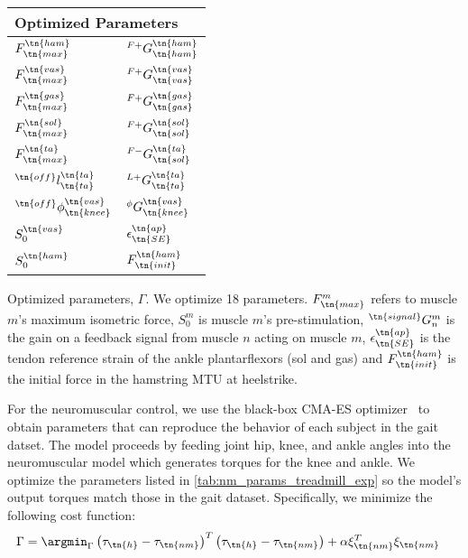 \begin{margintable}    
    \centering
    \normalsize
    \begin{tabular}{ll}
        \multicolumn{2}{l}{Optimized Parameters} \\
        \midrule
        $F_\tn{max}^\tn{ham}$              & $^{F+}G_\tn{ham}^\tn{ham}$   \\
        $F_\tn{max}^\tn{vas}$              & $^{F+}G_\tn{vas}^\tn{vas}$   \\
        $F_\tn{max}^\tn{gas}$              & $^{F+}G_\tn{gas}^\tn{gas}$   \\
        $F_\tn{max}^\tn{sol}$              & $^{F+}G_\tn{sol}^\tn{sol}$   \\
        $F_\tn{max}^\tn{ta}$               & $^{F-}G_\tn{sol}^\tn{ta}$    \\
        $^\tn{off}l_\tn{ta}^\tn{ta}$       & $^{L+}G_\tn{ta}^\tn{ta}$     \\
        $^\tn{off}\phi_\tn{knee}^\tn{vas}$ & ${^\phi}G_\tn{knee}^\tn{vas}$ \\
        $S_0^\tn{vas}$                     & $\epsilon_\tn{SE}^\tn{ap}$   \\
        $S_0^\tn{ham}$                     & $F_\tn{init}^\tn{ham}$       \\
    \end{tabular}
    \caption[Parameters optimized for parameter set generation for experiment
    comparing neuromuscular and impedance control]{Optimized parameters,
    $\Gamma$. We optimize 18 parameters. $F_\tn{max}^m$ refers to muscle $m$'s
    maximum isometric force, $S_0^m$ is muscle $m$'s pre-stimulation,
    $^\tn{signal} G_n^m$ is the gain on a feedback signal from muscle $n$
    acting on muscle $m$, $\epsilon_\tn{SE}^\tn{ap}$ is the tendon reference
    strain of the ankle plantarflexors (sol and gas) and $F_\tn{init}^\tn{ham}$
    is the initial force in the hamstring MTU at
    heelstrike.}\label{tab:nm_params_treadmill_exp}
\end{margintable}
For the neuromuscular control, we use the black-box CMA-ES
optimizer~\citep{hansen2006cma} to obtain parameters that can reproduce the
behavior of each subject in the gait datset. The model proceeds by feeding joint
hip, knee, and ankle angles into the neuromuscular model which generates torques
for the knee and ankle. We optimize the parameters listed in
\cref{tab:nm_params_treadmill_exp} so the model's output torques match those in
the gait dataset. Specifically, we minimize the following cost function:
\begin{align}
    \Gamma &= \argmin_\Gamma \left(\tau_\tn{h} - \tau_\tn{nm} \right)^T
    \left(\tau_\tn{h} - \tau_\tn{nm} \right) + \alpha \xi_\tn{nm}^T \xi_\tn{nm}
\end{align}
